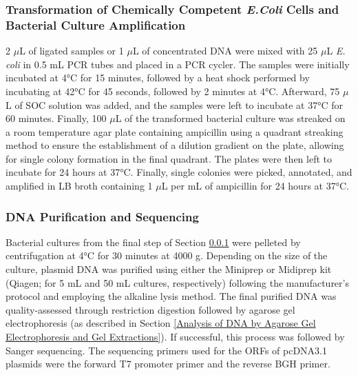 \subsubsection[Transformation of \textit{E.Coli} and Bacterial Culture]{Transformation of Chemically Competent \textit{E.Coli} Cells and Bacterial Culture Amplification} \label{Transformation of Chemically Competent E.Coli Cells and Bacterial Culture Amplification}
2 \(\mu\)L of ligated samples or 1 \(\mu\)L of concentrated DNA were mixed with 25 \(\mu\)L \textit{E. coli} in 0.5 mL PCR tubes and placed in a PCR cycler. The samples were initially incubated at 4°C for 15 minutes, followed by a heat shock performed by incubating at 42°C for 45 seconds, followed by 2 minutes at 4°C. Afterward, 75 \(\mu\)L of SOC solution was added, and the samples were left to incubate at 37°C for 60 minutes. Finally, 100 \(\mu\)L of the transformed bacterial culture was streaked on a room temperature agar plate containing ampicillin using a quadrant streaking method to ensure the establishment of a dilution gradient on the plate, allowing for single colony formation in the final quadrant. The plates were then left to incubate for 24 hours at 37°C. Finally, single colonies were picked, annotated, and amplified in LB broth containing 1 \(\mu\)L per mL of ampicillin for 24 hours at 37°C.

\subsubsection{DNA Purification and Sequencing} \label{DNA Purification and Sequencing}
Bacterial cultures from the final step of Section \ref{Transformation of Chemically Competent E.Coli Cells and Bacterial Culture Amplification} were pelleted by centrifugation at 4°C for 30 minutes at 4000 g. Depending on the size of the culture, plasmid DNA was purified using either the Miniprep or Midiprep kit (Qiagen; for 5 mL and 50 mL cultures, respectively) following the manufacturer's protocol and employing the alkaline lysis method. The final purified DNA was quality-assessed through restriction digestion followed by agarose gel electrophoresis (as described in Section \ref{Analysis of DNA by Agarose Gel Electrophoresis and Gel Extractions}). If successful, this process was followed by Sanger sequencing. The sequencing primers used for the ORFs of pcDNA3.1 plasmids were the forward T7 promoter primer and the reverse BGH primer.

